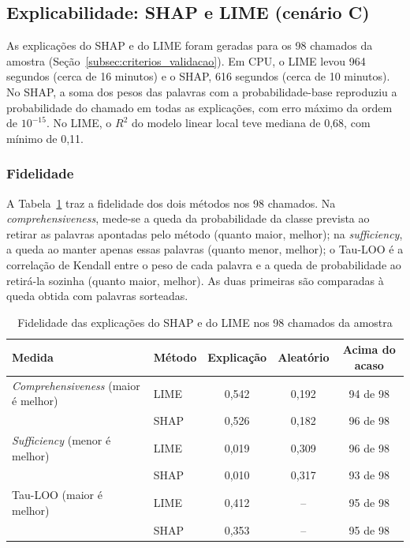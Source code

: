 \documentclass[
    12pt,                %
    openright,           %
    oneside,             %
    a4paper,             %
    english,             %
    brazil               %
]{abntex2}
\begin{document}
\subsection{Explicabilidade: SHAP e LIME (cenário C)}
As explicações do SHAP e do LIME foram geradas para os 98 chamados da amostra (Seção~\ref{subsec:criterios_validacao}). Em CPU, o LIME levou 964 segundos (cerca de 16 minutos) e o SHAP, 616 segundos (cerca de 10 minutos). No SHAP, a soma dos pesos das palavras com a probabilidade-base reproduziu a probabilidade do chamado em todas as explicações, com erro máximo da ordem de $10^{-15}$. No LIME, o $R^2$ do modelo linear local teve mediana de 0,68, com mínimo de 0,11.

\subsubsection{Fidelidade}
\label{subsubsec:res_fidelidade}

A Tabela~\ref{tab:res_fidelidade} traz a fidelidade dos dois métodos nos 98 chamados. Na \textit{comprehensiveness}, mede-se a queda da probabilidade da classe prevista ao retirar as palavras apontadas pelo método (quanto maior, melhor); na \textit{sufficiency}, a queda ao manter apenas essas palavras (quanto menor, melhor); o Tau-LOO é a correlação de Kendall entre o peso de cada palavra e a queda de probabilidade ao retirá-la sozinha (quanto maior, melhor). As duas primeiras são comparadas à queda obtida com palavras sorteadas.

\begin{table}[htb]
  \centering
  \caption{Fidelidade das explicações do SHAP e do LIME nos 98 chamados da amostra}
  \label{tab:res_fidelidade}
  \small
  \begin{tabular}{p{4.6cm}lccc}
    \toprule
    Medida & Método & Explicação & Aleatório & Acima do acaso \\
    \midrule
    \textit{Comprehensiveness} (maior é melhor) & LIME & 0,542 & 0,192 & 94 de 98 \\
     & SHAP & 0,526 & 0,182 & 96 de 98 \\
    \addlinespace
    \textit{Sufficiency} (menor é melhor) & LIME & 0,019 & 0,309 & 96 de 98 \\
     & SHAP & 0,010 & 0,317 & 93 de 98 \\
    \addlinespace
    Tau-LOO (maior é melhor) & LIME & 0,412 & -- & 95 de 98 \\
     & SHAP & 0,353 & -- & 95 de 98 \\
    \bottomrule
  \end{tabular}
\end{table}
\end{document}
